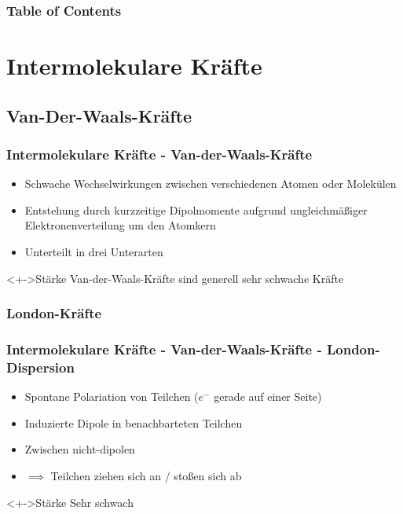 \begin{frame}
\frametitle{Table of Contents}
\tableofcontents
\end{frame}


\section{Intermolekulare Kräfte}
\subsection{Van-Der-Waals-Kräfte}
\begin{frame}
\frametitle{Intermolekulare Kräfte - Van-der-Waals-Kräfte}
\begin{itemize}
	\item<+-> Schwache Wechselwirkungen zwischen verschiedenen Atomen oder Molekülen
	\item<+-> Entstehung durch kurzzeitige Dipolmomente aufgrund ungleichmäßiger Elektronenverteilung um den Atomkern
	\item<+-> Unterteilt in drei Unterarten
\end{itemize}
\begin{block}<+->{Stärke}
	Van-der-Waals-Kräfte sind generell sehr schwache Kräfte
\end{block}
\end{frame}

\subsubsection{London-Kräfte}
\begin{frame}
\frametitle{Intermolekulare Kräfte - Van-der-Waals-Kräfte - London-Dispersion}
\begin{itemize}
	\item<+-> Spontane Polariation von Teilchen ($e^-$  gerade auf einer Seite)
	\item<+-> Induzierte Dipole in benachbarteten Teilchen
	\item<+-> Zwischen nicht-dipolen
	\item<+-> $\implies$ Teilchen ziehen sich an / stoßen sich ab
\end{itemize}
\begin{block}<+->{Stärke}
	Sehr schwach
\end{block}
\end{frame}

